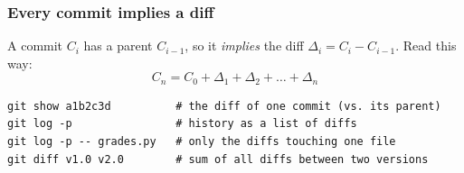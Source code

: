 \documentclass[aspectratio=169,10pt,compress]{beamer}
\begin{document}
\begin{frame}[t,fragile] \frametitle{Every commit implies a diff}
  \begin{center}
  \end{center}

  A commit $C_i$ has a parent $C_{i-1}$, so it \emph{implies} the diff
  $\Delta_i = C_i - C_{i-1}$. Read this way:
  \[
    C_n = C_0 + \Delta_1 + \Delta_2 + \dots + \Delta_n
  \]

\begin{lstlisting}
git show a1b2c3d          # the diff of one commit (vs. its parent)
git log -p                # history as a list of diffs
git log -p -- grades.py   # only the diffs touching one file
git diff v1.0 v2.0        # sum of all diffs between two versions
\end{lstlisting}
\end{frame}
\end{document}
